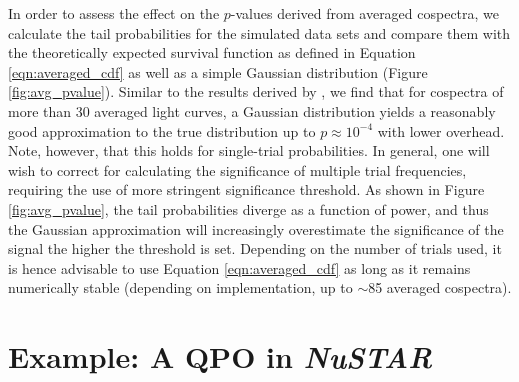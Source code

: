 \documentclass[12pt]{emulateapj}
\newcommand{\project}[1]{\textsl{#1}}
\newcommand{\nustar}{\project{NuSTAR}\xspace}
\begin{document}
In order to assess the effect on the $p$-values derived from averaged cospectra, we calculate the tail probabilities for the simulated data sets and compare them with the theoretically expected survival function as defined in Equation \ref{eqn:averaged_cdf} as well as a simple Gaussian distribution (Figure \ref{fig:avg_pvalue}). Similar to the results derived by \citet{balakrishnan1986}, we find that for cospectra of more than 30 averaged light curves, a Gaussian distribution yields a reasonably good approximation to the true distribution up to $p \approx 10^{-4}$ with lower overhead. Note, however, that this holds for single-trial probabilities. In general, one will wish to correct for calculating the significance of multiple trial frequencies, requiring the use of more stringent significance threshold. As shown in Figure \ref{fig:avg_pvalue}, the tail probabilities diverge as a function of power, and thus the Gaussian approximation will increasingly overestimate the significance of the signal the higher the threshold is set. Depending on the number of trials used, it is hence advisable to use Equation \ref{eqn:averaged_cdf} as long as it remains numerically stable (depending on implementation, up to $\sim$85 averaged cospectra).


\section{Example: A QPO in \nustar}
\label{sec:nustarqpo}
\end{document}
